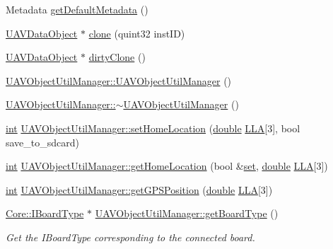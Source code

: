 \begin{DoxyCompactItemize}
Metadata \hyperlink{group___u_a_v_objects_plugin_ga70dc88d1d9ca2e85da5f1285ee578d36}{get\-Default\-Metadata} ()
\item 
\hyperlink{class_u_a_v_data_object}{U\-A\-V\-Data\-Object} $\ast$ \hyperlink{group___u_a_v_objects_plugin_gab86084dd3556b645fa8020dc33776d88}{clone} (quint32 inst\-I\-D)
\item 
\hyperlink{class_u_a_v_data_object}{U\-A\-V\-Data\-Object} $\ast$ \hyperlink{group___u_a_v_objects_plugin_ga46e0ca858c7ae3bd991cbd13319515f6}{dirty\-Clone} ()
\item 
\hyperlink{group___u_a_v_objects_plugin_gaa646568941e8ce857e188b39c90cef6d}{U\-A\-V\-Object\-Util\-Manager\-::\-U\-A\-V\-Object\-Util\-Manager} ()
\item 
\hyperlink{group___u_a_v_objects_plugin_gaffdcd54a6b9ce6a7dcf10beb881f71a7}{U\-A\-V\-Object\-Util\-Manager\-::$\sim$\-U\-A\-V\-Object\-Util\-Manager} ()
\item 
\hyperlink{ioapi_8h_a787fa3cf048117ba7123753c1e74fcd6}{int} \hyperlink{group___u_a_v_objects_plugin_gafcfa22c5812ed36ca7a2d6e442ba1710}{U\-A\-V\-Object\-Util\-Manager\-::set\-Home\-Location} (\hyperlink{_super_l_u_support_8h_a8956b2b9f49bf918deed98379d159ca7}{double} \hyperlink{_o_p_plots_8m_ac4d07718b2724e836be86fbe0c8c5704}{L\-L\-A}\mbox{[}3\mbox{]}, bool save\-\_\-to\-\_\-sdcard)
\item 
\hyperlink{ioapi_8h_a787fa3cf048117ba7123753c1e74fcd6}{int} \hyperlink{group___u_a_v_objects_plugin_gac5e7b38a473a50f709fb6312ef511e59}{U\-A\-V\-Object\-Util\-Manager\-::get\-Home\-Location} (bool \&\hyperlink{analyze_raw_8m_a11671e12e7b3fc5881313758d6cc0b45}{set}, \hyperlink{_super_l_u_support_8h_a8956b2b9f49bf918deed98379d159ca7}{double} \hyperlink{_o_p_plots_8m_ac4d07718b2724e836be86fbe0c8c5704}{L\-L\-A}\mbox{[}3\mbox{]})
\item 
\hyperlink{ioapi_8h_a787fa3cf048117ba7123753c1e74fcd6}{int} \hyperlink{group___u_a_v_objects_plugin_gade02e26d0bb8afe69edff8a076882dcd}{U\-A\-V\-Object\-Util\-Manager\-::get\-G\-P\-S\-Position} (\hyperlink{_super_l_u_support_8h_a8956b2b9f49bf918deed98379d159ca7}{double} \hyperlink{_o_p_plots_8m_ac4d07718b2724e836be86fbe0c8c5704}{L\-L\-A}\mbox{[}3\mbox{]})
\item 
\hyperlink{class_core_1_1_i_board_type}{Core\-::\-I\-Board\-Type} $\ast$ \hyperlink{group___u_a_v_objects_plugin_gac3a1293716fa3eb310ed257ade7f6722}{U\-A\-V\-Object\-Util\-Manager\-::get\-Board\-Type} ()
\begin{DoxyCompactList}\small\item\em Get the I\-Board\-Type corresponding to the connected board. \end{DoxyCompactList}\item 

\end{DoxyCompactItemize}
